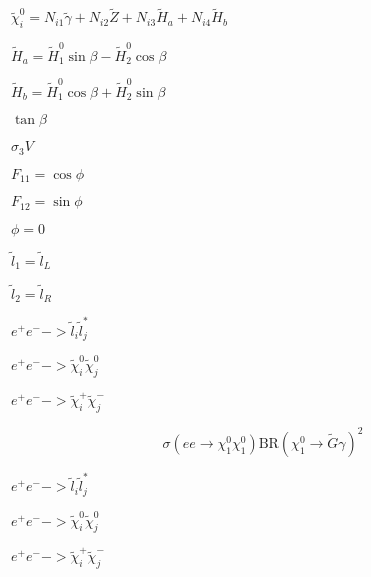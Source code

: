 \documentclass{article}
\begin{document}
$\tilde\chi_i^0 = N_{i1} \tilde\gamma + N_{i2} \tilde Z + N_{i3} \tilde H_a + N_{i4} \tilde H_b$
\pagebreak

$\tilde H_a = \tilde H_1^0 \sin\beta - \tilde H_2^0 \cos\beta$
\pagebreak

$\tilde H_b = \tilde H_1^0 \cos\beta + \tilde H_2^0 \sin\beta$
\pagebreak

$\tan\beta$
\pagebreak

$\sigma_3 V$
\pagebreak

$F_{11}=\cos\phi$
\pagebreak

$F_{12}=\sin\phi$
\pagebreak

$\phi = 0$
\pagebreak

$\tilde l_1 = \tilde l_L$
\pagebreak

$\tilde l_2 = \tilde l_R$
\pagebreak

$ e^+e^- -> \tilde l_i \tilde l_j^* $
\pagebreak

$ e^+e^- -> \tilde\chi^0_i \tilde\chi^0_j $
\pagebreak

$ e^+e^- -> \tilde\chi^+_i \tilde\chi^-_j $
\pagebreak

\[
\sigma(ee \to \chi^0_1\chi^0_1) \textrm{BR}(\chi^0_1 \to \tilde{G}\gamma)^2
\]
\pagebreak

$e^+e^- -> \tilde l_i \tilde l_j^*$
\pagebreak

$e^+e^- -> \tilde\chi^0_i \tilde\chi^0_j$
\pagebreak

$e^+e^- -> \tilde\chi^+_i \tilde\chi^-_j$
\pagebreak
\end{document}
